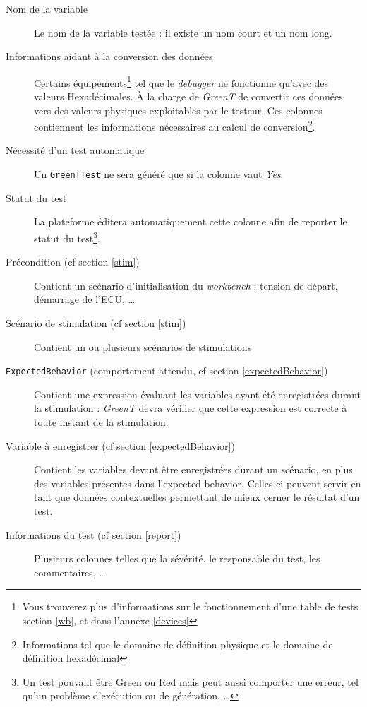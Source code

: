 \begin{description} 
	\item[Nom de la variable] Le nom de la variable testée : il existe un nom court et un nom long.
	\item[Informations aidant à la conversion des données] Certains équipements\footnote{Vous trouverez plus d'informations sur le fonctionnement d'une table de tests section \ref{wb}, et dans l'annexe \ref{devices}} tel que le \textit{debugger} ne fonctionne qu'avec des
	valeurs Hexadécimales. À la charge de \textit{GreenT} de convertir ces données vers des valeurs physiques exploitables par
	le testeur. Ces colonnes contiennent les informations nécessaires au calcul de conversion\footnote{Informations tel que le
		domaine de définition physique et le domaine de définition hexadécimal}.
	\item[Nécessité d'un test automatique] Un \texttt{GreenTTest} ne sera généré que si la colonne vaut \textit{Yes}.
	\item[Statut du test] La plateforme éditera automatiquement cette colonne afin de reporter le statut du test\footnote{Un test pouvant être Green ou Red
		mais peut aussi comporter une erreur, tel qu'un problème d'exécution ou de génération, \ldots}.
	\item[Précondition (cf section \ref{stim})] Contient un scénario d'initialisation du \textit{workbench} : tension de départ,
	démarrage de l'ECU, \ldots
	\item[Scénario de stimulation (cf section \ref{stim})] Contient un ou plusieurs scénarios de stimulations
	\item[\texttt{ExpectedBehavior} (comportement attendu, cf section \ref{expectedBehavior})] Contient une expression évaluant les variables ayant été enregistrées durant la stimulation : \textit{GreenT} devra vérifier que cette expression est correcte à toute instant de la stimulation.
	\item[Variable à enregistrer (cf section \ref{expectedBehavior})] Contient les variables devant être enregistrées durant un
	scénario, en plus des variables présentes dans l'expected behavior. Celles-ci peuvent servir en tant que données
	contextuelles permettant de mieux cerner le résultat d'un test.
	\item[Informations du test (cf section \ref{report})] Plusieurs colonnes telles que la sévérité, le responsable du test, les commentaires, \ldots
\end{description}


